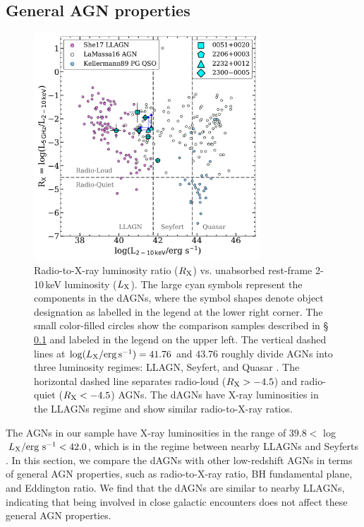 \documentclass[iop,revtex4,twocolumn,apj,numberedappendix,appendixfloats]{emulateapj}
\newcommand{\lx}{$L_{\rm X}$}
\begin{document}
\subsection{General AGN properties} \label{sec:Lx}

\begin{figure}
\includegraphics[width=8.5cm]{figs/Rx_Lx.pdf}
\caption{Radio-to-X-ray luminosity ratio ($R_{\rm X}$) vs. unabsorbed rest-frame 2-10\,keV luminosity (\lx). The large cyan symbols represent the components in the dAGNs, where the symbol shapes denote object designation as labelled in the legend at the lower right corner. The small color-filled circles show the comparison samples described in \S\,\ref{sec:Lx} and labeled in the legend on the upper left. The vertical dashed lines at $\log (L_{\rm X}/{\rm erg\,s}^{-1}) = 41.76$ and $43.76$ roughly divide AGNs into three luminosity regimes: LLAGN, Seyfert, and Quasar \citep{Brusa07}. The horizontal dashed line separates radio-loud ($R_{\rm X} > -4.5$) and radio-quiet ($R_{\rm X} < -4.5$) AGNs. The dAGNs have X-ray luminosities in the LLAGNs regime and show similar radio-to-X-ray ratios.}
\label{fig:Rx}
\end{figure}

The AGNs in our sample have X-ray luminosities in the range of $39.8 <$ log$\,L_{\rm X}/{\rm erg~s}^{-1} < 42.0$, which is in the regime between nearby LLAGNs and Seyferts \citep{Ho08}. In this section, we compare the dAGNs with other low-redshift AGNs in terms of general AGN properties, such as radio-to-X-ray ratio, BH fundamental plane, and Eddington ratio. We find that the dAGNs are similar to nearby LLAGNs, indicating that being involved in close galactic encounters does not affect these general AGN properties. 
\end{document}
